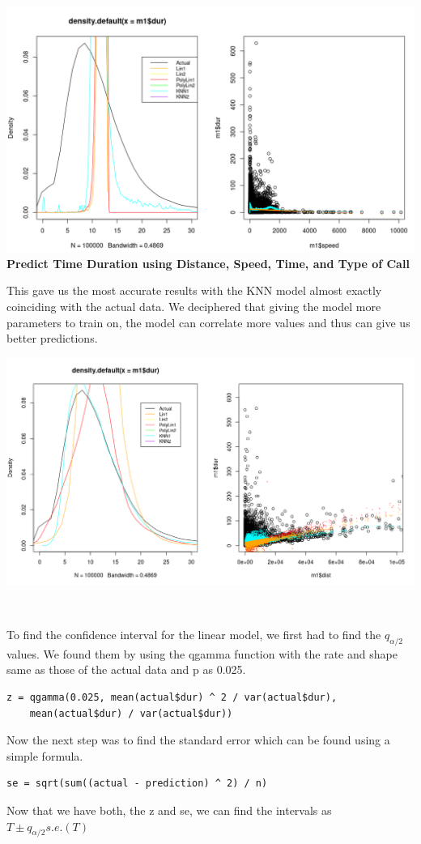 \documentclass[11pt]{article}
\begin{document}
\noindent\includegraphics[scale = .45]{speed_pred.png}\\

\textbf{Predict Time Duration using Distance, Speed, Time, and Type of Call}
\par
This gave us the most accurate results with the KNN model almost exactly coinciding with the actual data. We deciphered that giving the model more parameters to train on, the model can correlate more values and thus can give us better predictions.

\noindent\includegraphics[scale = .40]{all_pred.png}\\

\newpage

\\
\par
To find the confidence interval for the linear model, we first had to find the $q_{\alpha/2}$ values. We found them by using the qgamma function with the rate and shape same as those of the actual data and p as 0.025.
\begin{lstlisting}
z = qgamma(0.025, mean(actual$dur) ^ 2 / var(actual$dur), 
    mean(actual$dur) / var(actual$dur))
\end{lstlisting}
\par
Now the next step was to find the standard error which can be found using a simple formula.
\begin{lstlisting}
se = sqrt(sum((actual - prediction) ^ 2) / n)
\end{lstlisting}
Now that we have both, the z and se, we can find the intervals as $T \pm q_{\alpha/2} s.e.(T)$
\end{document}
